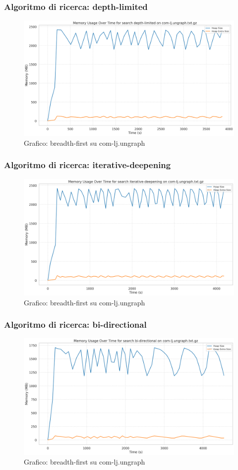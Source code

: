 \documentclass{article}
\begin{document}
\subsubsection{Algoritmo di ricerca: depth-limited}
\begin{figure}[htbp]\centering
\includegraphics[width=\textwidth]{../plots/com-lj.ungraph_depth-limited.png}
\caption{Grafico: breadth-first su com-lj.ungraph}
\end{figure}
\subsubsection{Algoritmo di ricerca: iterative-deepening}
\begin{figure}[htbp]\centering
\includegraphics[width=\textwidth]{../plots/com-lj.ungraph_iterative-deepening.png}
\caption{Grafico: breadth-first su com-lj.ungraph}
\end{figure}
\subsubsection{Algoritmo di ricerca: bi-directional}
\begin{figure}[htbp]\centering
\includegraphics[width=\textwidth]{../plots/com-lj.ungraph_bi-directional.png}
\caption{Grafico: breadth-first su com-lj.ungraph}
\end{figure}
\end{document}
